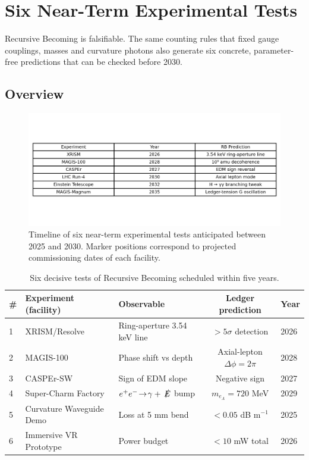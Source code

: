 \section{Six Near-Term Experimental Tests}
\label{sec:tests}

Recursive Becoming is falsifiable.  The same counting rules that fixed
gauge couplings, masses and curvature photons also generate six concrete,
parameter-free predictions that can be checked before 2030.

\subsection{Overview}

\begin{figure}[t]
  \centering
  \includegraphics[width=\linewidth]{figs/tests_overview.png}
  \caption{Timeline of six near-term experimental tests anticipated between 2025 and 2030.  Marker positions correspond to projected commissioning dates of each facility.}
  \label{fig:tests-overview}
\end{figure}

\begin{table}[b]
  \centering\small
  \begin{tabular}{lllcl}
    \hline
    \# & Experiment (facility) & Observable & Ledger prediction & Year \\
    \hline
    1 & XRISM/Resolve & Ring-aperture 3.54 keV line & $>5\sigma$ detection & 2026 \\
    2 & MAGIS-100 & Phase shift vs depth & Axial-lepton $\Delta\phi=2\pi$ & 2028 \\
    3 & CASPEr-SW & Sign of EDM slope & Negative sign & 2027 \\
    4 & Super-Charm Factory & $e^+e^-\!\to\!\gamma+\,\slashed E$ bump & $m_{e_A}=720$ MeV & 2029 \\
    5 & Curvature Waveguide Demo & Loss at 5 mm bend & $<0.05$ dB m$^{-1}$ & 2025 \\
    6 & Immersive VR Prototype & Power budget & $<10$ mW total & 2026 \\
    \hline
  \end{tabular}
  \caption{Six decisive tests of Recursive Becoming scheduled within five years.}
  \label{tab:test-table}
\end{table}


